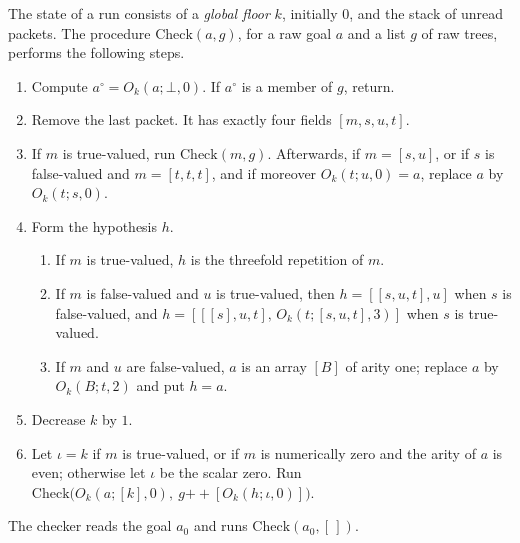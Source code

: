 \begin{definition}\label{cert:def:base}
The state of a run consists of a \emph{global floor} $k$, initially $0$, and
the stack of unread packets. The procedure $\mathrm{Check}(a,g)$, for a raw
goal $a$ and a list $g$ of raw trees, performs the following steps.
\begin{enumerate}[label=(\arabic*)]
\item Compute $a^{\circ}=O_k(a;\bot,0)$. If $a^{\circ}$ is a member of $g$,
return.
\item Remove the last packet. It has exactly four fields $[m,s,u,t]$.
\item If $m$ is true-valued, run $\mathrm{Check}(m,g)$. Afterwards, if
$m=[s,u]$, or if $s$ is false-valued and $m=[t,t,t]$, and if moreover
$O_k(t;u,0)=a$, replace $a$ by $O_k(t;s,0)$.
\item Form the hypothesis $h$.
 \begin{enumerate}[label=(\roman*)]
 \item If $m$ is true-valued, $h$ is the threefold repetition of $m$.
 \item If $m$ is false-valued and $u$ is true-valued, then $h=[[s,u,t],u]$
 when $s$ is false-valued, and $h=[[[s],u,t],\,O_k(t;[s,u,t],3)]$ when $s$ is
 true-valued.
 \item If $m$ and $u$ are false-valued, $a$ is an array $[B]$ of arity one;
 replace $a$ by $O_k(B;t,2)$ and put $h=a$.
 \end{enumerate}
\item Decrease $k$ by $1$.
\item Let $\iota=k$ if $m$ is true-valued, or if $m$ is numerically zero and
the arity of $a$ is even; otherwise let $\iota$ be the scalar zero. Run
$\mathrm{Check}\bigl(O_k(a;[k],0),\ g\mathbin{+\!\!+}[O_k(h;\iota,0)]\bigr)$.
\end{enumerate}
The checker reads the goal $a_0$ and runs $\mathrm{Check}(a_0,[\,])$.
\end{definition}

